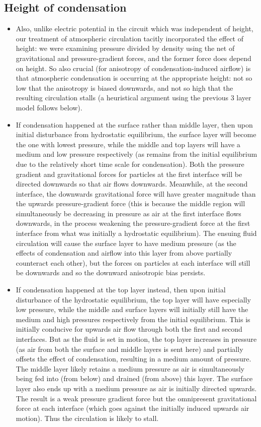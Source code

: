 \subsection{Height of condensation}

\begin{itemize}
	\item Also, unlike electric potential in the circuit which was independent of height, our treatment of atmospheric circulation tacitly incorporated the effect of height: we were examining pressure divided by density using the net of gravitational and pressure-gradient forces, and the former force does depend on height. So also crucial (for anisotropy of condensation-induced airflow) is that atmospheric condensation is occurring at the appropriate height: not so low that the anisotropy is biased downwards, and not so high that the resulting circulation stalls (a heuristical argument using the previous 3 layer model follows below).
	\item If condensation happened at the surface rather than middle layer, then upon initial disturbance from hydrostatic equilibrium, the surface layer will become the one with lowest pressure, while the middle and top layers will have a medium and low pressure respectively (as remains from the initial equilibrium due to the relatively short time scale for condensation). Both the pressure gradient and gravitational forces for particles at the first interface will be directed downwards so that air flows downwards. Meanwhile, at the second interface, the downwards gravitational force will have greater magnitude than the upwards pressure-gradient force (this is because the middle region will simultaneously be decreasing in pressure as air at the first interface flows downwards, in the process weakening the pressure-gradient force at the first interface from what was initially a hydrostatic equilibrium). The ensuing fluid circulation will cause the surface layer to have medium pressure (as the effects of condensation and airflow into this layer from above partially counteract each other), but the forces on particles at each interface will still be downwards and so the downward anisotropic bias persists.
	\item If condensation happened at the top layer instead, then upon initial disturbance of the hydrostatic equilibrium, the top layer will have especially low pressure, while the middle and surface layers will initially still have the medium and high pressures respectively from the initial equilibrium. This is initially conducive for upwards air flow through both the first and second interfaces. But as the fluid is set in motion, the top layer increases in pressure (as air from both the surface and middle layers is sent here) and partially offsets the effect of condensation, resulting in a medium amount of pressure. The middle layer likely retains a medium pressure as air is simultaneously being fed into (from below) and drained (from above) this layer. The surface layer also ends up with a medium pressure as air is initially directed upwards. The result is a weak pressure gradient force but the omnipresent gravitational force at each interface (which goes against the initially induced upwards air motion). Thus the circulation is likely to stall.
\end{itemize}
